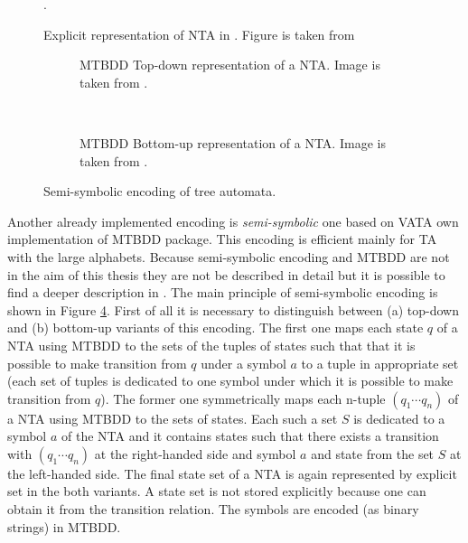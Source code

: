 \begin{figure}[bt]
\begin{center}

	\caption{Explicit representation of NTA in \vata. Figure is taken from \cite{libvata}}.
	\label{fig:explnta}
\end{center}
\end{figure}

\begingroup
{}%
\begin{figure}[bt]
	\centering
	\begin{subfigure}{.5\textwidth}
		\centering
		
		\caption{MTBDD Top-down representation of a NTA. Image is taken from \cite{libvata}.}
		\label{fig:mtbdd_td}
	\end{subfigure}%
	~
	\begin{subfigure}{.5\textwidth}
	\centering
	
	\caption{MTBDD Bottom-up representation of a NTA. Image is taken from \cite{libvata}.}
	\label{fig:mtbdd_bu}
	\end{subfigure}%
\caption{Semi-symbolic encoding of tree automata.}
\label{fig:symnta}
\end{figure}
\endgroup

Another already implemented encoding is \emph{semi-symbolic} one based on VATA own implementation of MTBDD package.
This encoding is efficient mainly for TA with the large alphabets.
Because semi-symbolic encoding and MTBDD are not in the aim of this thesis they are not be described in detail
but it is possible to find a deeper description in \cite{mt:lengal}.
The main principle of semi-symbolic encoding is shown in Figure \ref{fig:symnta}.
First of all it is necessary to distinguish between (a) top-down and (b) bottom-up variants of this encoding.
The first one maps each state $q$ of a NTA using MTBDD to the sets of the tuples of states such that that it is possible
to make transition from $q$ under a symbol $a$ to a tuple in appropriate set (each set of tuples is dedicated
to one symbol under which it is possible to make transition from $q$).
The former one symmetrically maps each n-tuple $(q_1 \cdots q_n)$ of a NTA using MTBDD to the sets of states.
Each such a set $S$ is dedicated to a symbol $a$ of the NTA and
it contains states such that there exists a transition
with $(q_1 \cdots q_n)$ at the right-handed side and symbol $a$ and state from the set $S$ at the left-handed side.
The final state set of a NTA is again represented by explicit set in the both variants.
A state set is not stored explicitly because one can obtain it from the transition relation.
The symbols are encoded (as binary strings) in MTBDD.

